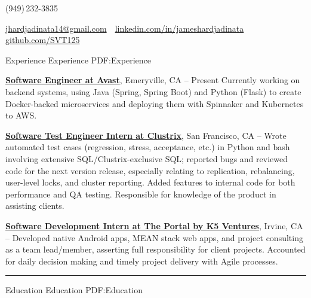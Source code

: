 \documentclass[letterpaper,MMMyyyy,nonstopmode]{simpleresumecv}
\makeatletter
\newcommand{\ResumeAuthor}{James Hardjadinata}
\newcommand{\ResumeWebsite}{github.com/SVT125}
\newcommand{\ResumeLinkedin}{linkedin.com/in/jameshardjadinata}
\newcommand{\ResumeEmail}{jhardjadinata14@gmail.com}
\makeatother
\begin{document}

\Title{\ResumeAuthor}
\begin{SubTitle}
(949)\,232-3835
\par
\href{mailto:\ResumeEmail}
{\ResumeEmail}
\,\textbullet\,
\href{\ResumeLinkedin}
{\url{\ResumeLinkedin}}\,
\,\textbullet\,
\href{\ResumeWebsite}
{\url{\ResumeWebsite}}
\end{SubTitle}

\begin{Body}


\Section
{Experience}
{Experience}
{PDF:Experience}

\Entry
\href{https://www.locationlabs.com/}
{\textbf{Software Engineer at Avast}},
Emeryville, CA
\hfill
{} --
Present
\Gap
Currently working on backend systems, using Java (Spring, Spring Boot) and Python (Flask) to create Docker-backed microservices and deploying them with Spinnaker and Kubernetes to AWS.
\newline

\Entry
\href{http://www.clustrix.com/}
{\textbf{Software Test Engineer Intern at Clustrix}},
San Francisco, CA
\hfill
{} --
\Gap
Wrote automated test cases (regression, stress, acceptance, etc.) in Python and bash involving extensive SQL/Clustrix-exclusive
SQL; reported bugs and reviewed code for the next version release, especially relating to replication, rebalancing, user-level locks, and cluster reporting. Added features to internal code for both performance and QA
testing. Responsible for knowledge of the product in assisting clients.\newline

\Entry
\href{http://www.theportal.io/}
{\textbf{Software Development Intern at The Portal by K5 Ventures}},
Irvine, CA
\hfill
{} --
\Gap
Developed native Android apps, MEAN stack web apps, and project consulting as a team lead/member, asserting full
responsibility for client projects. Accounted for daily decision making and timely project delivery with Agile processes.\newline

\hrule


\Section
{Education}
{Education}
{PDF:Education}


\end{Body}
\end{document}
